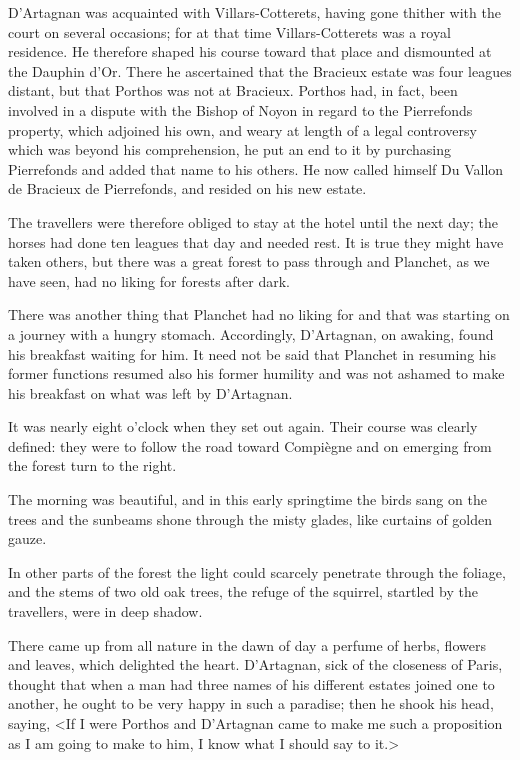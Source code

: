 D'Artagnan was acquainted with Villars-Cotterets, having gone thither with the court on several occasions; for at that time Villars-Cotterets was a royal residence. He therefore shaped his course toward that place and dismounted at the Dauphin d'Or. There he ascertained that the Bracieux estate was four leagues distant, but that Porthos was not at Bracieux. Porthos had, in fact, been involved in a dispute with the Bishop of Noyon in regard to the Pierrefonds property, which adjoined his own, and weary at length of a legal controversy which was beyond his comprehension, he put an end to it by purchasing Pierrefonds and added that name to his others. He now called himself Du Vallon de Bracieux de Pierrefonds, and resided on his new estate.

The travellers were therefore obliged to stay at the hotel until the next day; the horses had done ten leagues that day and needed rest. It is true they might have taken others, but there was a great forest to pass through and Planchet, as we have seen, had no liking for forests after dark.

There was another thing that Planchet had no liking for and that was starting on a journey with a hungry stomach. Accordingly, D'Artagnan, on awaking, found his breakfast waiting for him. It need not be said that Planchet in resuming his former functions resumed also his former humility and was not ashamed to make his breakfast on what was left by D'Artagnan.

It was nearly eight o'clock when they set out again. Their course was clearly defined: they were to follow the road toward Compiègne and on emerging from the forest turn to the right.

The morning was beautiful, and in this early springtime the birds sang on the trees and the sunbeams shone through the misty glades, like curtains of golden gauze.

In other parts of the forest the light could scarcely penetrate through the foliage, and the stems of two old oak trees, the refuge of the squirrel, startled by the travellers, were in deep shadow.

There came up from all nature in the dawn of day a perfume of herbs, flowers and leaves, which delighted the heart. D'Artagnan, sick of the closeness of Paris, thought that when a man had three names of his different estates joined one to another, he ought to be very happy in such a paradise; then he shook his head, saying, <If I were Porthos and D'Artagnan came to make me such a proposition as I am going to make to him, I know what I should say to it.>

